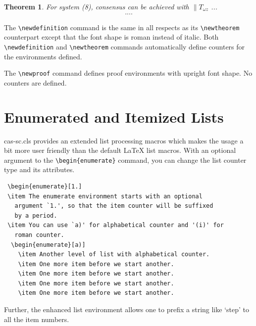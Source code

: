 \documentclass[a4paper,fleqn]{cas-sc}
\begin{document}
\newtheorem{theorem}{Theorem}

\begin{theorem}
For system (8), consensus can be achieved with 
$\|T_{\omega z}$ ...
\begin{eqnarray}\label{10}
....
\end{eqnarray}
\end{theorem}

The \verb+\newdefinition+ command is the same in
all respects as its \verb+\newtheorem+ counterpart except that
the font shape is roman instead of italic.  Both
\verb+\newdefinition+ and \verb+\newtheorem+ commands
automatically define counters for the environments defined.

The \verb+\newproof+ command defines proof environments with
upright font shape.  No counters are defined. 


\section[Enumerated ...]{Enumerated and Itemized Lists}
{cas-sc.cls} provides an extended list processing macros
which makes the usage a bit more user friendly than the default
\LaTeX{} list macros.   With an optional argument to the
\verb+\begin{enumerate}+ command, you can change the list counter
type and its attributes.

\begin{verbatim}
 \begin{enumerate}[1.]
 \item The enumerate environment starts with an optional
   argument `1.', so that the item counter will be suffixed
   by a period.
 \item You can use `a)' for alphabetical counter and '(i)' for
   roman counter.
  \begin{enumerate}[a)]
    \item Another level of list with alphabetical counter.
    \item One more item before we start another.
    \item One more item before we start another.
    \item One more item before we start another.
    \item One more item before we start another.
\end{verbatim}

Further, the enhanced list environment allows one to prefix a
string like `step' to all the item numbers.  
\end{document}
